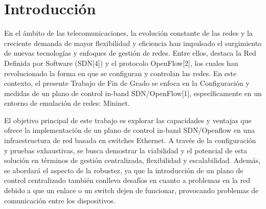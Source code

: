 \documentclass[a4paper, 12pt]{book}
\begin{document}
	
	
	\tableofcontents 
	\cleardoublepage
	\listoffigures %
	
	
	
	\clearpage
	\chapter{Introducción}
	\label{sec:intro} %
	
	
	En el ámbito de las telecomunicaciones, la evolución constante de las redes y la creciente demanda de mayor flexibilidad y eficiencia han impulsado el surgimiento de nuevas tecnologías y enfoques de gestión de redes. Entre ellos, destaca la Red Definida por Software (SDN[4]) y el protocolo OpenFlow[2], los cuales han revolucionado la forma en que se configuran y controlan las redes. En este contexto, el presente Trabajo de Fin de Grado se enfoca en la Configuración y medidas de un plano de control in-band SDN/OpenFlow[1], específicamente en un entorno de emulación de redes: Mininet.
	
	El objetivo principal de este trabajo es explorar las capacidades y ventajas que ofrece la implementación de un plano de control in-band SDN/Openflow en una infraestructura de red basada en switches Ethernet. A través de la configuración y pruebas exhaustivas, se busca demostrar la viabilidad y el potencial de esta solución en términos de gestión centralizada, flexibilidad y escalabilidad. Además, se abordará el aspecto de la robustez, ya que la introducción de un plano de control centralizado también conlleva desafíos en cuanto a problemas en la red debido a que un enlace o un switch dejen de funcionar, provocando problemas de comunicación entre los dispositivos.
	
\end{document}
